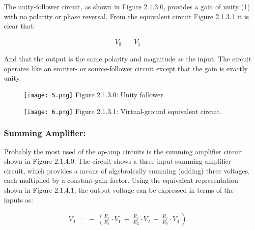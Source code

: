 The unity-follower circuit, as shown in Figure 2.1.3.0, provides a gain of unity (1) with no polarity or phase reversal. From the equivalent circuit Figure 2.1.3.1 it is clear that: \hfill \break

\begin{ceqn}
\begin{align*}
V_{0}\ =\ V_{1}
\end{align*}
\end{ceqn} \hfill

And that the output is the same polarity and magnitude as the input. The circuit operates like an emitter- or source-follower circuit except that the gain is exactly unity. \hfill \break

\begin{multicols}{2}
\begin{figure}[H]
\texttt{[image: 5.png]}
\centering \linebreak \linebreak Figure 2.1.3.0: Unity follower.
\end{figure}

\begin{figure}[H]
\texttt{[image: 6.png]}
\centering \linebreak \linebreak Figure 2.1.3.1: Virtual-ground equivalent circuit.
\end{figure}
\end{multicols}

\pagebreak

\subsubsection{Summing Amplifier:}


Probably the most used of the op-amp circuits is the summing amplifier circuit shown in Figure 2.1.4.0. The circuit shows a three-input summing amplifier circuit, which provides a means of algebraically summing (adding) three voltages, each multiplied by a constant-gain factor. Using the equivalent representation shown in Figure 2.1.4.1, the output voltage can be expressed in terms of the inputs as:

\begin{ceqn}
\begin{align*}
V_{0}\ =\ -\ ( \frac{R_{f}}{R_{1}} \cdot V_{1} \ +\ \frac{R_{f}}{R_{2}} \cdot V_{2} \ +\ \frac{R_{f}}{R_{3}} \cdot V_{3}\ )
\end{align*}
\end{ceqn} \hfill

